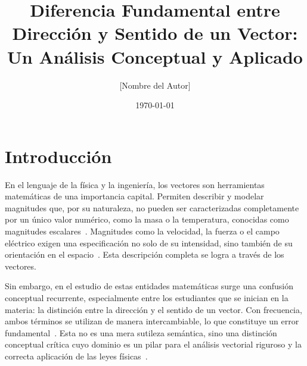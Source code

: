 \documentclass[12pt,a4paper]{article}
\title{\textbf{Diferencia Fundamental entre Dirección y Sentido de un Vector: Un Análisis Conceptual y Aplicado}}
\author{[Nombre del Autor]}
\date{\today}
\begin{document}
 
\maketitle

\newpage

\tableofcontents
\newpage

\section{Introducción} \label{sec:introduccion}

En el lenguaje de la física y la ingeniería, los vectores son herramientas matemáticas de una importancia capital. Permiten describir y modelar magnitudes que, por su naturaleza, no pueden ser caracterizadas completamente por un único valor numérico, como la masa o la temperatura, conocidas como magnitudes escalares~\cite{grossman2012}. Magnitudes como la velocidad, la fuerza o el campo eléctrico exigen una especificación no solo de su intensidad, sino también de su orientación en el espacio~\cite{grossman2012}. Esta descripción completa se logra a través de los vectores.

Sin embargo, en el estudio de estas entidades matemáticas surge una confusión conceptual recurrente, especialmente entre los estudiantes que se inician en la materia: la distinción entre la dirección y el sentido de un vector. Con frecuencia, ambos términos se utilizan de manera intercambiable, lo que constituye un error fundamental~\cite{wikipedia_vector}. Esta no es una mera sutileza semántica, sino una distinción conceptual crítica cuyo dominio es un pilar para el análisis vectorial riguroso y la correcta aplicación de las leyes físicas~\cite{kolman2006}.
\end{document}
